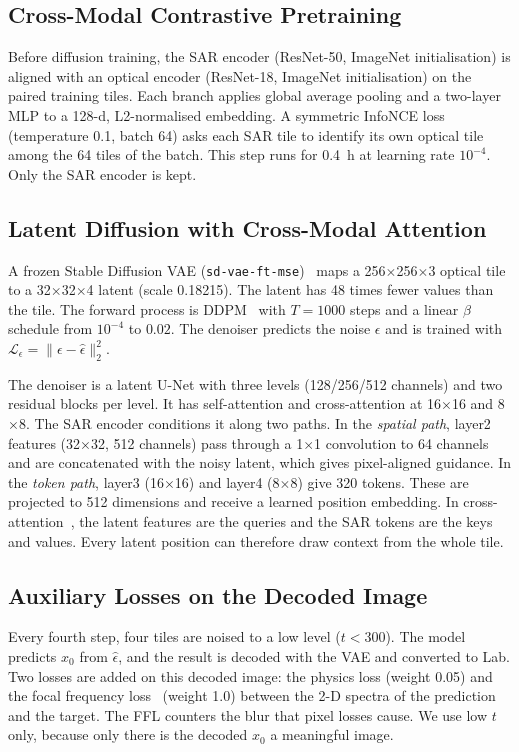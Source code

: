 \documentclass[conference]{IEEEtran}
\begin{document}
\subsection{Cross-Modal Contrastive Pretraining}
Before diffusion training, the SAR encoder (ResNet-50, ImageNet initialisation) is aligned
with an optical encoder (ResNet-18, ImageNet initialisation) on the paired training tiles.
Each branch applies global average pooling and a two-layer MLP to a 128-d, L2-normalised
embedding. A symmetric InfoNCE loss~\cite{oord2018cpc,radford2021clip} (temperature 0.1, batch
64) asks each SAR tile to identify its own optical tile among the 64 tiles of the batch. This step runs
for 0.4~h at learning rate $10^{-4}$. Only the SAR encoder is kept.

\subsection{Latent Diffusion with Cross-Modal Attention}
A frozen Stable Diffusion VAE (\texttt{sd-vae-ft-mse})~\cite{rombach2022ldm} maps a
256$\times$256$\times$3 optical tile to a 32$\times$32$\times$4 latent (scale 0.18215). The
latent has 48 times fewer values than the tile. The forward process is DDPM~\cite{ho2020ddpm}
with $T=1000$ steps and a linear $\beta$ schedule from $10^{-4}$ to $0.02$. The denoiser predicts the noise
$\epsilon$ and is trained with $\mathcal{L}_\epsilon = \lVert\epsilon - \hat\epsilon\rVert_2^2$.

The denoiser is a latent U-Net with three levels (128/256/512 channels) and two residual
blocks per level. It has self-attention and cross-attention at 16$\times$16 and 8$\times$8. The SAR encoder
conditions it along two paths. In the \emph{spatial path}, layer2 features (32$\times$32,
512 channels) pass through a 1$\times$1 convolution to 64 channels and are concatenated with
the noisy latent, which gives pixel-aligned guidance. In the \emph{token path}, layer3
(16$\times$16) and layer4 (8$\times$8) give 320 tokens. These are projected to 512 dimensions and
receive a learned position embedding. In cross-attention~\cite{vaswani2017attention}, the
latent features are the queries and the SAR tokens are the keys and values. Every latent
position can therefore draw context from the whole tile.

\subsection{Auxiliary Losses on the Decoded Image}
Every fourth step, four tiles are noised to a low level ($t < 300$). The model predicts $x_0$
from $\hat\epsilon$, and the result is decoded with the VAE and converted to Lab. Two losses
are added on this decoded image: the physics loss (weight 0.05) and the focal frequency
loss~\cite{jiang2021ffl} (weight 1.0) between the 2-D spectra of the prediction and the
target. The FFL counters the blur that pixel losses cause. We use low $t$ only, because only
there is the decoded $x_0$ a meaningful image.
\end{document}
